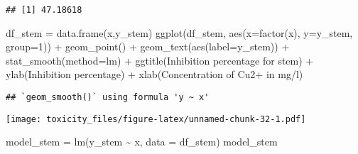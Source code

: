 \documentclass[
]{article}
\newenvironment{Shaded}{\begin{snugshade}}{\end{snugshade}}
\newcommand{\AttributeTok}[1]{\textcolor[rgb]{0.77,0.63,0.00}{#1}}
\newcommand{\DecValTok}[1]{\textcolor[rgb]{0.00,0.00,0.81}{#1}}
\newcommand{\FunctionTok}[1]{\textcolor[rgb]{0.00,0.00,0.00}{#1}}
\newcommand{\NormalTok}[1]{#1}
\newcommand{\OtherTok}[1]{\textcolor[rgb]{0.56,0.35,0.01}{#1}}
\newcommand{\SpecialCharTok}[1]{\textcolor[rgb]{0.00,0.00,0.00}{#1}}
\newcommand{\StringTok}[1]{\textcolor[rgb]{0.31,0.60,0.02}{#1}}
\begin{document}
\begin{Shaded}
\end{Shaded}

\begin{verbatim}
## [1] 47.18618
\end{verbatim}

\begin{Shaded}
\begin{Highlighting}[]
\NormalTok{df\_stem }\OtherTok{=} \FunctionTok{data.frame}\NormalTok{(x,y\_stem)}
\FunctionTok{ggplot}\NormalTok{(df\_stem, }\FunctionTok{aes}\NormalTok{(}\AttributeTok{x=}\FunctionTok{factor}\NormalTok{(x), }\AttributeTok{y=}\NormalTok{y\_stem, }\AttributeTok{group=}\DecValTok{1}\NormalTok{)) }\SpecialCharTok{+} \FunctionTok{geom\_point}\NormalTok{() }\SpecialCharTok{+} \FunctionTok{geom\_text}\NormalTok{(}\FunctionTok{aes}\NormalTok{(}\AttributeTok{label=}\NormalTok{y\_stem)) }\SpecialCharTok{+} \FunctionTok{stat\_smooth}\NormalTok{(}\AttributeTok{method=}\StringTok{\textquotesingle{}lm\textquotesingle{}}\NormalTok{) }\SpecialCharTok{+} \FunctionTok{ggtitle}\NormalTok{(}\StringTok{\textquotesingle{}Inhibition percentage for stem\textquotesingle{}}\NormalTok{) }\SpecialCharTok{+} \FunctionTok{ylab}\NormalTok{(}\StringTok{\textquotesingle{}Inhibition percentage\textquotesingle{}}\NormalTok{) }\SpecialCharTok{+} \FunctionTok{xlab}\NormalTok{(}\StringTok{\textquotesingle{}Concentration of Cu2+ in mg/l\textquotesingle{}}\NormalTok{)}
\end{Highlighting}
\end{Shaded}

\begin{verbatim}
## `geom_smooth()` using formula 'y ~ x'
\end{verbatim}

\texttt{[image: toxicity\_files/figure-latex/unnamed-chunk-32-1.pdf]}

\begin{Shaded}
\begin{Highlighting}[]
\NormalTok{model\_stem }\OtherTok{=} \FunctionTok{lm}\NormalTok{(y\_stem }\SpecialCharTok{\textasciitilde{}}\NormalTok{ x, }\AttributeTok{data =}\NormalTok{ df\_stem)}
\NormalTok{model\_stem}
\end{Highlighting}
\end{Shaded}
\end{document}
